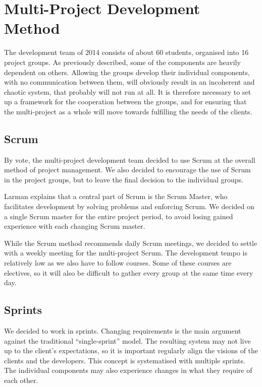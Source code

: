
\section{Multi-Project Development Method}\label{sec:giraf:development}
The \giraf development team of 2014 consists of about 60 students, organised into 16 project groups. 
As previously described, some of the \giraf components are heavily dependent on others. 
Allowing the groups develop their individual components, with no communication between them, will obviously result in an incoherent and chaotic system, that probably will not run at all. 
It is therefore necessary to set up a framework for the cooperation between the groups, and for ensuring that the multi-project as a whole will move towards fulfilling the needs of the clients.

\subsection{Scrum}
By vote, the multi-project development team decided to use Scrum at the overall method of project management. 
We also decided to encourage the use of Scrum in the project groups, but to leave the final decision to the individual groups. 

Larman \cite{larmanAgile} explains that a central part of Scrum is the Scrum Master, who facilitates development by solving problems and enforcing Scrum. We decided on a single Scrum master for the entire project period, to avoid losing gained experience with each changing Scrum master.

While the Scrum method recommends daily Scrum meetings, we decided to settle with a weekly meeting for the multi-project Scrum. The development tempo is relatively low as we also have to follow courses. Some of these courses are electives, so it will also be difficult to gather every group at the same time every day.

\subsection{Sprints}
We decided to work in sprints. Changing requirements is the main argument against the traditional ``single-sprint'' model. The resulting system may not live up to the client's expectations, so it is important regularly align the visions of the clients and the developers. This concept is systematised with multiple sprints. The individual components may also experience changes in what they require of each other.

